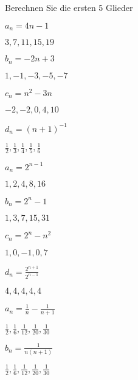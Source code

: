 \begin{exercisesK}
\endtwocol

Berechnen Sie die ersten 5 Glieder
\twocol

\begin{exercise} $a_{n} = 4n -1$\begin{answer}  $3,7,11,15,19$
\end{answer}
\end{exercise}
\begin{exercise} $b_{n} = -2n+3$\begin{answer} $1,-1,-3,-5,-7$ 
\end{answer}
\end{exercise}
\begin{exercise} $c_{n} = n^{2} -3n$\begin{answer}   $-2,-2,0,4,10$
\end{answer}
\end{exercise}
\begin{exercise}  $d_{n} = (n+1)^{-1}$\begin{answer}  $\frac{1}{2},\frac{1}{3}, \frac{1}{4},\frac{1}{5},\frac{1}{6}$
\end{answer}
\end{exercise}
\begin{exercise} $a_{n} = 2^{n-1}$\begin{answer} $1,2,4,8,16$ 
\end{answer}
\end{exercise}
\begin{exercise} $b_{n} = 2^{n}-1$\begin{answer}  $1,3,7,15,31$
\end{answer}
\end{exercise}
\begin{exercise}  $c_{n} = 2^{n}-n^{2}$\begin{answer}  $1,0,-1,0,7$
\end{answer}
\end{exercise}
\begin{exercise} $d_{n} = \frac{2^{n+1}}{2^{n-1}}$\begin{answer}  $4,4,4,4,4$
\end{answer}
\end{exercise}
\begin{exercise}  $a_{n} = \frac{1}{n}-\frac{1}{n+1}$\begin{answer} $\frac{1}{2},\frac{1}{6},\frac{1}{12},\frac{1}{20},\frac{1}{30}$  
\end{answer}
\end{exercise}
\begin{exercise}  $b_{n} = \frac{1}{n(n+1)}$\begin{answer}  $\frac{1}{2},\frac{1}{6},\frac{1}{12},\frac{1}{20},\frac{1}{30}$

\end{answer}
\end{exercise}
\end{exercisesK}
